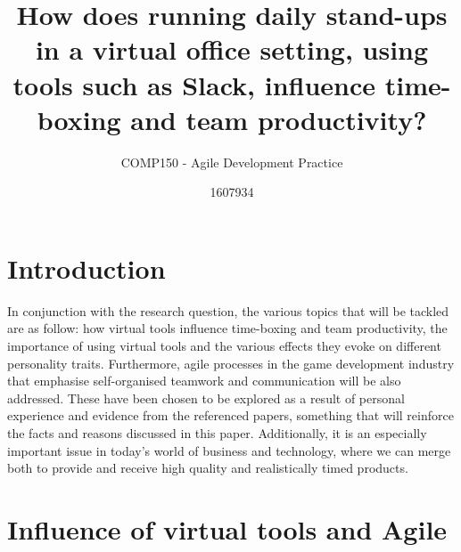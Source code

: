 \documentclass{scrartcl}
\title{How does running daily stand-ups in a virtual office setting, using tools such as Slack, influence time-boxing and team productivity?}
\subtitle{COMP150 - Agile Development Practice}
\author{1607934}
\begin{document}
\maketitle


\section{Introduction}

In conjunction with the research question, the various topics that will be tackled are as follow: how virtual tools influence time-boxing and team productivity, the importance of using virtual tools and the various effects they evoke on different personality traits. Furthermore, agile processes in the game development industry that emphasise self-organised teamwork and communication will be also addressed\cite{Manifesto}. These have been chosen to be explored as a result of personal experience and evidence from the referenced papers, something that will reinforce the facts and reasons discussed in this paper. Additionally, it is an especially important issue in today's world of business and technology, where we can merge both to provide and receive high quality and realistically timed products.


\section{Influence of virtual tools and Agile}
\end{document}

